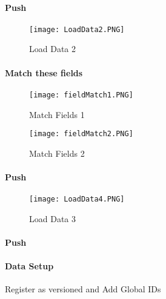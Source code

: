  \paragraph*{\Large Push }
 \begin{figure}[h!]
 \centering
     \texttt{[image: LoadData2.PNG]}
 \caption{Load Data 2}
 \end{figure}
 \clearpage
 \paragraph[Match these fields]{\Large Match these fields}

 \begin{figure}[h!]
 \centering
     \texttt{[image: fieldMatch1.PNG]}
 \vspace{-.2in}

 \caption{Match Fields 1}
 \end{figure}
 \begin{figure}[h!]
 \centering
     \texttt{[image: fieldMatch2.PNG]}
 \vspace{-.2in}

 \caption{Match Fields 2}
 \end{figure}
 \clearpage
 \paragraph*{\Large Push }
 \begin{figure}[h!]
 \centering
     \texttt{[image: LoadData4.PNG]}
 \caption{Load Data 3}
 \end{figure}
 \paragraph*{\Large Push }
 \clearpage
 \paragraph{Data Setup}
 \vspace{.2in}

 Register as versioned and Add Global IDs
 \vspace{.2in}

 \vspace{.2in}

